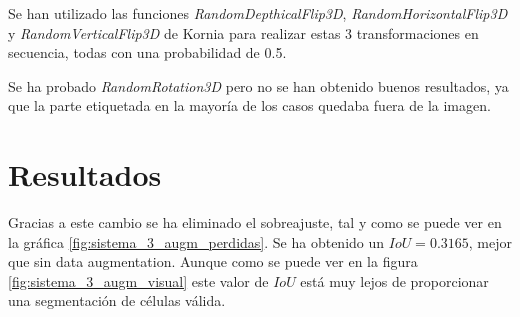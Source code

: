 Se han utilizado las funciones \textit{RandomDepthicalFlip3D}, \textit{RandomHorizontalFlip3D} y \textit{RandomVerticalFlip3D} de Kornia para realizar estas 3 transformaciones en secuencia, todas con una probabilidad de 0.5.

Se ha probado \textit{RandomRotation3D} pero no se han obtenido buenos resultados, ya que la parte etiquetada en la mayoría de los casos quedaba fuera de la imagen.

\section{Resultados}\label{sec:data_augmentation_resultados}




Gracias a este cambio se ha eliminado el sobreajuste, tal y como se puede ver en la gráfica \ref{fig:sistema_3_augm_perdidas}. Se ha obtenido un $IoU=0.3165$, mejor que sin data augmentation. Aunque como se puede ver en la figura \ref{fig:sistema_3_augm_visual} este valor de $IoU$ está muy lejos de proporcionar una segmentación de células válida.